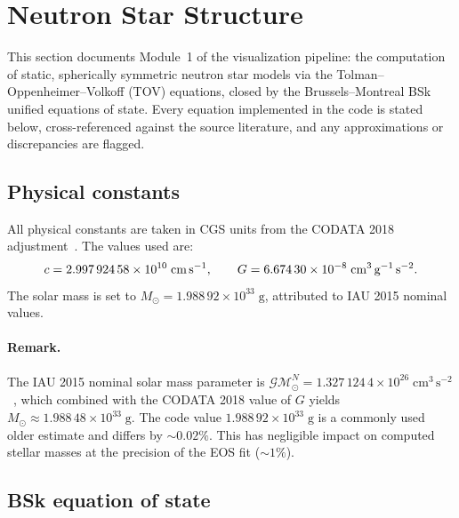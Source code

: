 \section{Neutron Star Structure}
\label{sec:ns_structure}

This section documents Module~1 of the visualization pipeline: the computation
of static, spherically symmetric neutron star models via the
Tolman--Oppenheimer--Volkoff (TOV) equations, closed by the Brussels--Montreal
BSk unified equations of state.  Every equation implemented in the code is
stated below, cross-referenced against the source literature, and any
approximations or discrepancies are flagged.

\subsection{Physical constants}
\label{sec:constants}

All physical constants are taken in CGS units from the CODATA 2018
adjustment~\cite{Tiesinga2021}.  The values used are:
%
\begin{equation}
  c = 2.997\,924\,58\times10^{10}\;\text{cm\,s}^{-1},\qquad
  G = 6.674\,30\times10^{-8}\;\text{cm}^{3}\,\text{g}^{-1}\,\text{s}^{-2}.
  \label{eq:cG}
\end{equation}
%
The solar mass is set to
$M_{\odot}=1.988\,92\times10^{33}\;\text{g}$, attributed to IAU 2015 nominal
values.

\paragraph{Remark.}
The IAU 2015 nominal solar mass parameter is
$\mathcal{GM}_{\odot}^{N}=1.327\,124\,4\times10^{26}\;\text{cm}^{3}\,
\text{s}^{-2}$~\cite{IAU2015},
which combined with the CODATA 2018 value of $G$ yields
$M_{\odot}\approx1.988\,48\times10^{33}\;\text{g}$.
The code value $1.988\,92\times10^{33}\;\text{g}$ is a commonly used older
estimate and differs by ${\sim}0.02\%$.  This has negligible impact on
computed stellar masses at the precision of the EOS fit (${\sim}1\%$).

\subsection{BSk equation of state}
\label{sec:bsk_eos}

